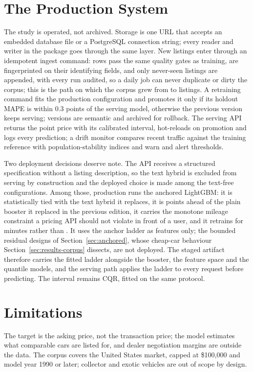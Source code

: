 \documentclass[journal,10pt]{IEEEtran}
\begin{document}
\section{The Production System}
\label{sec:production}
The study is operated, not archived. Storage is one URL that accepts an embedded database file or a PostgreSQL connection string; every reader and writer in the package goes through the same layer. New listings enter through an idempotent ingest command: rows pass the same quality gates as training, are fingerprinted on their identifying fields, and only never-seen listings are appended, with every run audited, so a daily job can never duplicate or dirty the corpus; this is the path on which the corpus grew from \PilotRows{} to \NRows{} listings. A retraining command fits the production configuration and promotes it only if its holdout MAPE is within 0.3 points of the serving model, otherwise the previous version keeps serving; versions are semantic and archived for rollback. The serving API returns the point price with its calibrated interval, hot-reloads on promotion and logs every prediction; a drift monitor compares recent traffic against the training reference with population-stability indices and warn and alert thresholds.

Two deployment decisions deserve note. The API receives a structured specification without a listing description, so the text hybrid is excluded from serving by construction and the deployed choice is made among the text-free configurations. Among those, production runs the anchored LightGBM: it is statistically tied with the text hybrid it replaces, it is \AnchorGain{} points ahead of the plain booster it replaced in the previous edition, it carries the monotone mileage constraint a pricing API should not violate in front of a user, and it retrains for \AnchLgbmFitMin{} minutes rather than \ChampionFitMin{}. It uses the anchor ladder as features only; the bounded residual designs of Section~\ref{sec:anchored}, whose cheap-car behaviour Section~\ref{sec:results-corpus} dissects, are not deployed. The staged artifact therefore carries the fitted ladder alongside the booster, the feature space and the quantile models, and the serving path applies the ladder to every request before predicting. The interval remains CQR, fitted on the same protocol.

\section{Limitations}
\label{sec:limitations}
The target is the asking price, not the transaction price; the model estimates what comparable cars are listed for, and dealer negotiation margins are outside the data. The corpus covers the United States market, capped at \$100{,}000 and model year 1990 or later; collector and exotic vehicles are out of scope by design.
\end{document}
